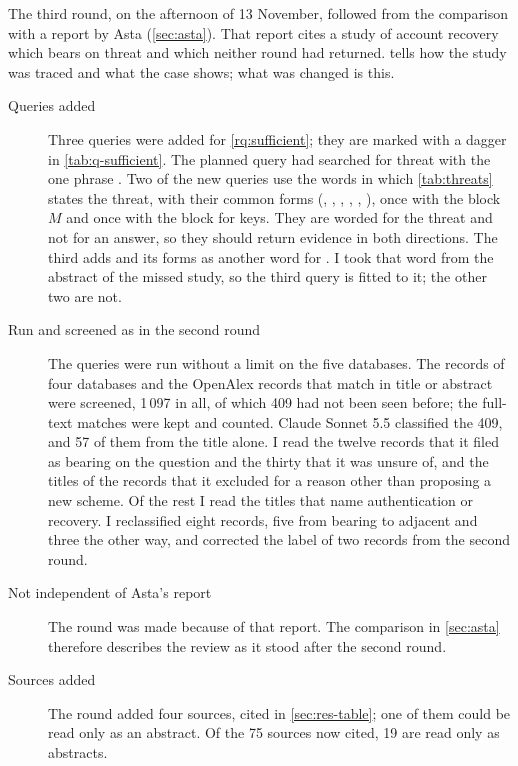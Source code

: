 The third round, on the afternoon of 13 November, followed from the
comparison with a report by Asta (\cref{sec:asta}).
That report cites a study of account recovery which bears on threat
 and which neither round had returned.
 tells how the study was traced and what the case
shows; what was changed is this.
\begin{description}
  \item[Queries added] Three queries were added for
    \cref{rq:sufficient}; they are marked with a dagger in
    \cref{tab:q-sufficient}.
    The planned query had searched for threat  with the one
    phrase .
    Two of the new queries use the words in which \cref{tab:threats}
    states the threat, with their common forms (,
    , , , ,
    ), once with the block $M$ and once with the block
    for keys.
    They are worded for the threat and not for an answer, so they
    should return evidence in both directions.
    The third adds  and its forms as another word for
    .
    I took that word from the abstract of the missed study, so the
    third query is fitted to it; the other two are not.
  \item[Run and screened as in the second round] The queries were run
    without a limit on the five databases.
    The records of four databases and the OpenAlex records that match
    in title or abstract were screened, 1\,097 in all, of which 409 had
    not been seen before; the full-text matches were kept and counted.
    Claude Sonnet 5.5 classified the 409, and 57 of them from the title
    alone.
    I read the twelve records that it filed as bearing on the question
    and the thirty that it was unsure of, and the titles of the records
    that it excluded for a reason other than proposing a new scheme.
    Of the rest I read the titles that name authentication or
    recovery.
    I reclassified eight records, five from bearing to adjacent and
    three the other way, and corrected the label of two records from
    the second round.
  \item[Not independent of Asta's report] The round was made because
    of that report.
    The comparison in \cref{sec:asta} therefore describes the review as
    it stood after the second round.
  \item[Sources added] The round added four sources, cited in
    \cref{sec:res-table}; one of them could be read only as an
    abstract.
    Of the 75 sources now cited, 19 are read only as abstracts.
\end{description}


